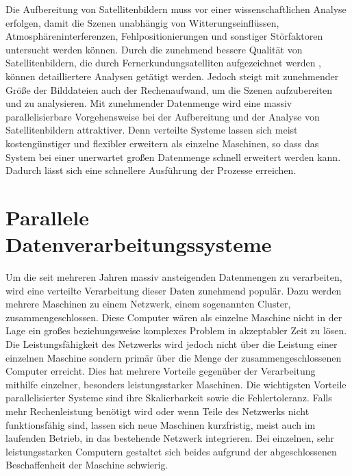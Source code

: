 Die Aufbereitung von Satellitenbildern muss vor einer wissenschaftlichen Analyse erfolgen, damit die Szenen unabhängig von Witterungseinflüssen, Atmosphäreninterferenzen, Fehlpositionierungen und sonstiger Störfaktoren untersucht werden können. Durch die zunehmend bessere Qualität von Satellitenbildern, die durch Fernerkundungsatelliten aufgezeichnet werden \cite{Markham2004}, können detailliertere Analysen getätigt werden. Jedoch steigt mit zunehmender Größe der Bilddateien auch der Rechenaufwand, um die Szenen aufzubereiten und zu analysieren. Mit zunehmender Datenmenge wird eine massiv parallelisierbare Vorgehensweise bei der Aufbereitung und der Analyse von Satellitenbildern attraktiver. Denn verteilte Systeme lassen sich meist kostengünstiger und flexibler erweitern als einzelne Maschinen, so dass das System bei einer unerwartet großen Datenmenge schnell erweitert werden kann. Dadurch lässt sich eine schnellere Ausführung der Prozesse erreichen.


\section{Parallele Datenverarbeitungssysteme}
Um die seit mehreren Jahren massiv ansteigenden Datenmengen \cite{EMC2014} zu verarbeiten, wird eine verteilte Verarbeitung dieser Daten zunehmend populär. Dazu werden mehrere Maschinen zu einem Netzwerk, einem sogenannten Cluster, zusammengeschlossen. Diese Computer wären als einzelne Maschine nicht in der Lage ein großes beziehungsweise komplexes Problem in akzeptabler Zeit zu lösen. Die Leistungsfähigkeit des Netzwerks wird jedoch nicht über die Leistung einer einzelnen Maschine sondern primär über die Menge der zusammengeschlossenen Computer erreicht. Dies hat mehrere Vorteile gegenüber der Verarbeitung mithilfe einzelner, besonders leistungsstarker Maschinen. Die wichtigsten Vorteile parallelisierter Systeme sind ihre Skalierbarkeit sowie die Fehlertoleranz. Falls mehr Rechenleistung benötigt wird oder wenn Teile des Netzwerks nicht funktionsfähig sind, lassen sich neue Maschinen kurzfristig, meist auch im laufenden Betrieb, in das bestehende Netzwerk integrieren. Bei einzelnen, sehr leistungsstarken Computern gestaltet sich beides aufgrund der abgeschlossenen Beschaffenheit der Maschine schwierig.

